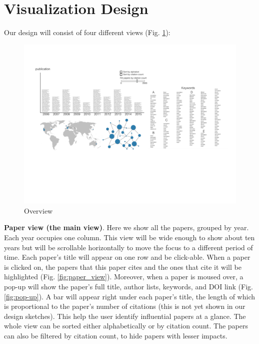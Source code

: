 \documentclass[dvips,12pt]{article}
\begin{document}
\section{Visualization Design}
Our design will consist of four different views (Fig. \ref*{fig:overview}):

\begin{figure}[ht!]
    \centering
    \includegraphics[width=\paperwidth]{visproposalDrawing_page_Part_1.pdf}
    \caption{Overview}
    \label{fig:overview}
\end{figure}

\textbf{Paper view (the main view)}. Here we show all the papers, grouped by year. Each year occupies one column. This view will be wide enough to show about ten years but will be scrollable horizontally to move the focus to a different period of time. Each paper's title will appear on one row and be click-able. When a paper is clicked on, the papers that this paper cites and the ones that cite it will be highlighted (Fig. \ref{fig:paper_view}). Moreover, when a paper is moused over, a pop-up will show the paper's full title, author lists, keywords, and DOI link (Fig. \ref{fig:pop-up}). A bar will appear right under each paper's title, the length of which is proportional to the paper's number of citations (this is not yet shown in our design sketches). This help the user identify influential papers at a glance. The whole view can be sorted either alphabetically or by citation count. The papers can also be filtered by citation count, to hide papers with lesser impacts.
\end{document}
